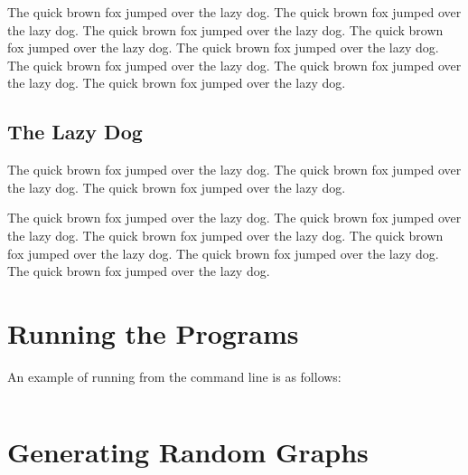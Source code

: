 \documentclass{l4proj}
\begin{document}
The quick brown fox jumped over the lazy dog.
The quick brown fox jumped over the lazy dog.
The quick brown fox jumped over the lazy dog.
The quick brown fox jumped over \cite{ckt} the lazy dog.
The quick brown fox jumped over the lazy dog.
The quick brown fox jumped over the lazy dog.
The quick brown fox jumped over the lazy dog.
The quick brown fox jumped over the lazy dog.

\section{The Lazy Dog}
The quick brown fox jumped over the lazy dog.
The quick brown fox jumped over the lazy dog.
The quick brown fox jumped over the lazy dog.

The quick brown fox jumped over the lazy dog.
The quick brown fox \cite{am97} jumped over the lazy dog.
The quick brown fox jumped over the lazy dog.
The quick brown fox jumped over the lazy dog.
The quick brown fox jumped over the lazy dog.
The quick brown fox jumped over the lazy dog.

\begin{appendices}

\chapter{Running the Programs}
An example of running from the command line is as follows:
\begin{verbatim}
\end{verbatim}


\chapter{Generating Random Graphs}
\label{sec:randomGraph}

\begin{verbatim}
\end{verbatim}
\end{appendices}




\end{document}
